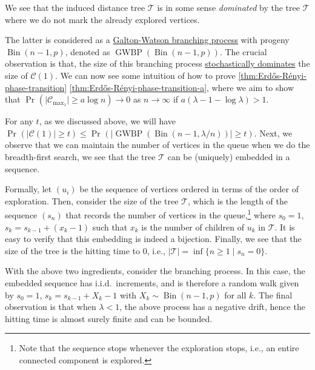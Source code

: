 \begin{intuition}
	We see that the induced distance tree \(\mathcal{T} \) is in some sense \emph{dominated} by the tree \(\mathcal{T} \) where we do not mark the already explored vertices.
\end{intuition}

The latter is considered as a \href{https://en.wikipedia.org/wiki/Galton%E2%80%93Watson_process}{Galton-Watson branching process} with progeny \(\operatorname{Bin}(n-1, p) \), denoted as \(\operatorname{GWBP}(\operatorname{Bin}(n-1, p) ) \). The crucial observation is that, the size of this branching process \hyperref[def:stochastic-domination]{stochastically dominates} the size of \(\mathcal{C} (1)\). We can now see some intuition of how to prove \autoref{thm:Erdős-Rényi-phase-transition} \autoref{thm:Erdős-Rényi-phase-transition-a}, where we aim to show that \(\Pr_{}(\lvert \mathcal{C} _{\max _1} \rvert \geq a \log n) \to 0\) as \(n \to \infty \) if \(a(\lambda - 1 - \log \lambda ) > 1\).

\begin{intuition}
	For any \(t\), as we discussed above, we will have \(\Pr_{}(\lvert \mathcal{C} (1) \rvert \geq t) \leq \Pr_{}(\lvert \operatorname{GWBP}(\operatorname{Bin}(n-1, \lambda / n) )  \rvert \geq t) \). Next, we observe that we can maintain the number of vertices in the queue when we do the breadth-first search, we see that the tree \(\mathcal{T} \) can be (uniquely) embedded in a sequence.

	Formally, let \((u_i)\) be the sequence of vertices ordered in terms of the order of exploration. Then, consider the size of the tree \(\mathcal{T} \), which is the length of the sequence \((s_n)\) that records the number of vertices in the queue,\footnote{Note that the sequence stops whenever the exploration stops, i.e., an entire connected component is explored.} where \(s_0 = 1\), \(s_k = s_{k-1} + (x_k - 1)\) such that \(x_k\) is the number of children of \(u_k\) in \(\mathcal{T} \). It is easy to verify that this embedding is indeed a bijection. Finally, we see that the size of the tree is the hitting time to \(0\), i.e., \(\lvert \mathcal{T} \rvert = \inf \{ n \geq 1 \mid s_n = 0 \} \).

	With the above two ingredients, consider the branching process. In this case, the embedded sequence has i.i.d.\ increments, and is therefore a random walk given by \(s_0 = 1\), \(s_k = s_{k-1} + X_k - 1\) with \(X_k \sim \operatorname{Bin}(n-1, p) \) for all \(k\). The final observation is that when \(\lambda < 1\), the above process has a negative drift, hence the hitting time is almost surely finite and can be bounded.
\end{intuition}